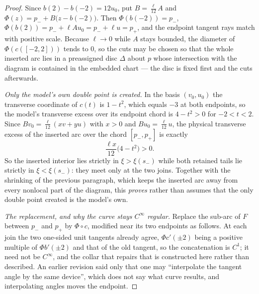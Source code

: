 \begin{proof}
Since $b(2)-b(-2)=12u_0$, put $B=\tfrac{\ell}{12}A$ and
$\Phi(z)=p_-+B\bigl(z-b(-2)\bigr)$. Then $\Phi(b(-2))=p_-$,
$\Phi(b(2))=p_-+\ell A u_0=p_-+\ell u=p_+$, and the endpoint tangent rays match
with positive scale. Because $\ell\to0$ while $A$ stays bounded, the diameter of
$\Phi(c([-2,2]))$ tends to $0$, so the cuts may be chosen so that the whole
inserted arc lies in a preassigned disc $\Delta$ about $p$ whose intersection
with the diagram is contained in the embedded chart --- the disc is fixed first
and the cuts afterwards.

\emph{Only the model's own double point is created.} In the basis $(v_0,u_0)$
the transverse coordinate of $c(t)$ is $1-t^2$, which equals $-3$ at both
endpoints, so the model's transverse excess over its endpoint chord is
$4-t^2>0$ for $-2<t<2$. Since $Bv_0=\tfrac{\ell}{12}(xv+yu)$ with $x>0$ and
$Bu_0=\tfrac{\ell}{12}u$, the physical transverse excess of the inserted arc
over the chord $[p_-,p_+]$ is exactly
\[
   \frac{\ell x}{12}\bigl(4-t^2\bigr)>0 .
\]
So the inserted interior lies strictly in $\xi>\xi(s_-)$ while both retained
tails lie strictly in $\xi<\xi(s_-)$: they meet only at the two joins. Together
with the shrinking of the previous paragraph, which keeps the inserted arc away
from every nonlocal part of the diagram, this \emph{proves} rather than assumes
that the only double point created is the model's own.

\emph{The replacement, and why the curve stays $C^\infty$ regular.} Replace the
sub-arc of $F$ between $p_-$ and $p_+$ by $\Phi\circ c$, modified near its two
endpoints as follows. At each join the two one-sided unit tangents already
agree, $\Phi c'(\pm2)$ being a positive multiple of $\Phi b'(\pm2)$ and that of
the old tangent, so the concatenation is $C^1$; it need not be $C^\infty$, and
the collar that repairs that is constructed here rather than described. An
earlier revision said only that one may ``interpolate the tangent angle by the
same device'', which does not say what curve results, and interpolating angles
moves the endpoint.


\end{proof}
